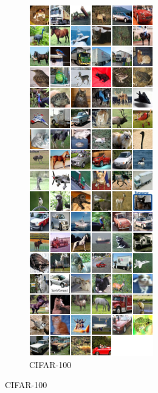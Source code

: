 \documentclass[11pt]{article}
\begin{document}
\begin{figure}[H]
\begin{subfigure}{.5\textwidth}
\includegraphics[scale=0.5]{torch/cifar100.png}
\caption{CIFAR-100 \label{fig2}}
\end{subfigure}
\end{figure}
\end{document}
